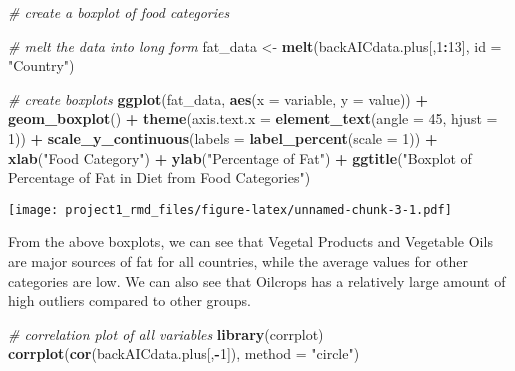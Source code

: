 \documentclass[
]{article}
\newenvironment{Shaded}{\begin{snugshade}}{\end{snugshade}}
\newcommand{\CommentTok}[1]{\textcolor[rgb]{0.56,0.35,0.01}{\textit{#1}}}
\newcommand{\DataTypeTok}[1]{\textcolor[rgb]{0.13,0.29,0.53}{#1}}
\newcommand{\DecValTok}[1]{\textcolor[rgb]{0.00,0.00,0.81}{#1}}
\newcommand{\KeywordTok}[1]{\textcolor[rgb]{0.13,0.29,0.53}{\textbf{#1}}}
\newcommand{\NormalTok}[1]{#1}
\newcommand{\OperatorTok}[1]{\textcolor[rgb]{0.81,0.36,0.00}{\textbf{#1}}}
\newcommand{\StringTok}[1]{\textcolor[rgb]{0.31,0.60,0.02}{#1}}
\begin{document}
\begin{Shaded}
\begin{Highlighting}[]
\CommentTok{# create a boxplot of food categories}


\CommentTok{# melt the data into long form}
\NormalTok{fat_data <-}\StringTok{ }\KeywordTok{melt}\NormalTok{(backAICdata.plus[,}\DecValTok{1}\OperatorTok{:}\DecValTok{13}\NormalTok{], }\DataTypeTok{id =} \StringTok{"Country"}\NormalTok{)}

\CommentTok{# create boxplots}
\KeywordTok{ggplot}\NormalTok{(fat_data, }\KeywordTok{aes}\NormalTok{(}\DataTypeTok{x =}\NormalTok{ variable, }\DataTypeTok{y =}\NormalTok{ value)) }\OperatorTok{+}
\StringTok{  }\KeywordTok{geom_boxplot}\NormalTok{() }\OperatorTok{+}
\StringTok{  }\KeywordTok{theme}\NormalTok{(}\DataTypeTok{axis.text.x =} \KeywordTok{element_text}\NormalTok{(}\DataTypeTok{angle =} \DecValTok{45}\NormalTok{, }\DataTypeTok{hjust =} \DecValTok{1}\NormalTok{)) }\OperatorTok{+}
\StringTok{  }\KeywordTok{scale_y_continuous}\NormalTok{(}\DataTypeTok{labels =} \KeywordTok{label_percent}\NormalTok{(}\DataTypeTok{scale =} \DecValTok{1}\NormalTok{)) }\OperatorTok{+}
\StringTok{  }\KeywordTok{xlab}\NormalTok{(}\StringTok{"Food Category"}\NormalTok{) }\OperatorTok{+}
\StringTok{  }\KeywordTok{ylab}\NormalTok{(}\StringTok{"Percentage of Fat"}\NormalTok{) }\OperatorTok{+}
\StringTok{  }\KeywordTok{ggtitle}\NormalTok{(}\StringTok{"Boxplot of Percentage of Fat in Diet from Food Categories"}\NormalTok{)}
\end{Highlighting}
\end{Shaded}

\texttt{[image: project1\_rmd\_files/figure-latex/unnamed-chunk-3-1.pdf]}

From the above boxplots, we can see that Vegetal Products and Vegetable
Oils are major sources of fat for all countries, while the average
values for other categories are low. We can also see that Oilcrops has a
relatively large amount of high outliers compared to other groups.

\begin{Shaded}
\begin{Highlighting}[]
\CommentTok{# correlation plot of all variables}
\KeywordTok{library}\NormalTok{(corrplot)}
\KeywordTok{corrplot}\NormalTok{(}\KeywordTok{cor}\NormalTok{(backAICdata.plus[,}\OperatorTok{-}\DecValTok{1}\NormalTok{]), }\DataTypeTok{method =} \StringTok{"circle"}\NormalTok{)}
\end{Highlighting}
\end{Shaded}
\end{document}
